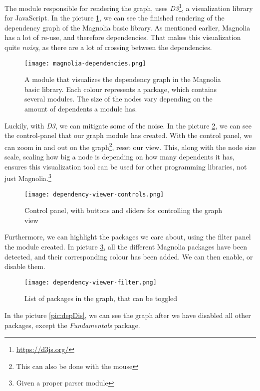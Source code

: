 The module responsible for rendering the graph, uses
\textit{D3}\footnote{\url{https://d3js.org/}}, a visualization library for
JavaScript. In the picture \ref{pic:magLib}, we can see the finished rendering
of the dependency graph of the Magnolia basic library. As mentioned earlier,
Magnolia has a lot of re-use, and therefore dependencies. That makes this
visualization quite \textit{noisy}, as there are a lot of crossing between the
dependencies.

\begin{figure}[H]
  \centering
  \texttt{[image: magnolia-dependencies.png]}
  \caption{
    A module that visualizes the dependency graph in the Magnolia basic library.
    Each colour represents a package, which contains several modules. The size
    of the nodes vary depending on the amount of dependents a module has.
  }
  \label{pic:magLib}
\end{figure}

Luckily, with \textit{D3}, we can mitigate some of the noise. In the picture
\ref{pic:depCont}, we can see the control-panel that our graph module has
created. With the control panel, we can zoom in and out on the graph\footnote{This can also be done with the mouse},
reset our view. This, along with the node size scale, scaling how big
a node is depending on how many dependents it has, ensures this visualization
tool can be used for other programming libraries, not just Magnolia.\footnote{Given a proper parser module}

\begin{figure}[H]
  \centering
  \texttt{[image: dependency-viewer-controls.png]}
  \caption{
    Control panel, with buttons and sliders for controlling the graph view
  }
  \label{pic:depCont}
\end{figure}

Furthermore, we can highlight the packages we care about, using the filter
panel the module created. In picture \ref{pic:depFil}, all the different
Magnolia packages have been detected, and their corresponding colour has been
added. We can then enable, or disable them.

\begin{figure}[H]
  \centering
  \texttt{[image: dependency-viewer-filter.png]}
  \caption{List of packages in the graph, that can be toggled}
  \label{pic:depFil}
\end{figure}

In the picture \ref{pic:depDis}, we can see the graph after we have disabled all
other packages, except the \textit{Fundamentals} package.

